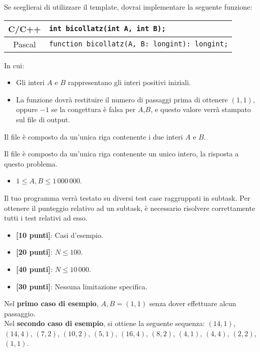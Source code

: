 Se sceglierai di utilizzare il template, dovrai implementare la seguente funzione:
\begin{center}\begin{tabularx}{\textwidth}{|c|X|}
\hline
C/C++  & \verb|int bicollatz(int A, int B);|\\
\hline
Pascal & \verb|function bicollatz(A, B: longint): longint;|\\
\hline
\end{tabularx}\end{center}
In cui:
\begin{itemize}[nolistsep]
  \item Gli interi $A$ e $B$ rappresentano gli interi positivi iniziali.
  \item La funzione dovrà restituire il numero di passaggi prima di ottenere $(1,1)$, oppure $-1$ se la congettura è falsa per $A$,$B$, e questo valore verrà stampato sul file di output.
\end{itemize}

\InputFile
Il file  è composto da un'unica riga contenente i due interi $A$ e $B$.

\OutputFile
Il file \outputfile{} è composto da un'unica riga contenente un unico intero, la risposta a questo problema.

\Constraints
\begin{itemize}[nolistsep, itemsep=2mm]
	\item $1 \le A, B \le 1\,000\,000$.
\end{itemize}

\Scoring
Il tuo programma verrà testato su diversi test case raggruppati in subtask.
Per ottenere il punteggio relativo ad un subtask, è necessario risolvere
correttamente tutti i test relativi ad esso.

\begin{itemize}[nolistsep,itemsep=2mm]
  \item \textbf{ [10 punti]}: Casi d'esempio.
  \item \textbf{ [20 punti]}: $N \leq 100$.
  \item \textbf{ [40 punti]}: $N \leq 10\,000$.
  \item \textbf{ [30 punti]}: Nessuna limitazione specifica.
\end{itemize}

\Examples
\begin{example}
%
%
\end{example}


\Explanation
Nel \textbf{primo caso di esempio}, $A,B = (1,1)$ senza dover effettuare alcun passaggio.\\[2mm]
Nel \textbf{secondo caso di esempio}, si ottiene la seguente sequenza: $(14,1)$, $(14,4)$, $(7,2)$, $(10,2)$, $(5,1)$, $(16,4)$, $(8,2)$, $(4,1)$, $(4,4)$, $(2,2)$, $(1,1)$.
